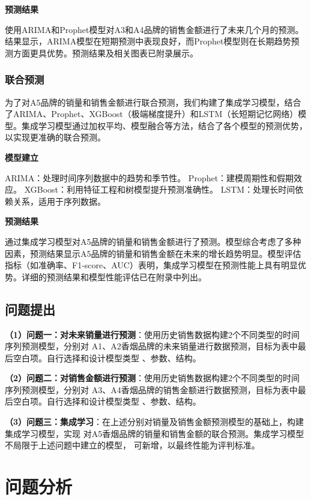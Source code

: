 \documentclass[a4paper]{article}
\begin{document}
	\textbf{预测结果}
	
	使用ARIMA和Prophet模型对A3和A4品牌的销售金额进行了未来几个月的预测。结果显示，ARIMA模型在短期预测中表现良好，而Prophet模型则在长期趋势预测方面更具优势。预测结果及相关图表已附录展示。
	
	\subsubsection{联合预测}
	
	为了对A5品牌的销量和销售金额进行联合预测，我们构建了集成学习模型，结合了ARIMA、Prophet、XGBoost（极端梯度提升）和LSTM（长短期记忆网络）模型。集成学习模型通过加权平均、模型融合等方法，结合了各个模型的预测优势，以实现更准确的联合预测。
	
	\textbf{模型建立}
	
	ARIMA：处理时间序列数据中的趋势和季节性。
	Prophet：建模周期性和假期效应。
	XGBoost：利用特征工程和树模型提升预测准确性。
	LSTM：处理长时间依赖关系，适用于序列数据。
	
	\textbf{预测结果}
	
	通过集成学习模型对A5品牌的销量和销售金额进行了预测。模型综合考虑了多种因素，预测结果显示A5品牌的销量和销售金额在未来的增长趋势明显。模型评估指标（如准确率、F1-score、AUC）表明，集成学习模型在预测性能上具有明显优势。详细的预测结果和模型性能评估已在附录中列出。
	
	\subsection{问题提出}
	\textbf{（1）问题一：对未来销量进行预测}：使用历史销售数据构建2个不同类型的时间序列预测模型，分别对
A1、A2香烟品牌的未来销量进行数据预测，目标为表中最后空白项。自行选择和设计模型类型
、参数、结构。

	\textbf{（2）问题二：对销售金额进行预测}：使用历史销售数据构建2个不同类型的时间序列预测模型，分别对
	A3、A4香烟品牌的销售金额进行数据预测，目标为表中最后空白项。自行选择和设计模型类型
	、参数、结构。

	\textbf{（3）问题三：集成学习}：在上述分别对销量及销售金额预测模型的基础上，构建集成学习模型，实现
	对A5香烟品牌的销量和销售金额的联合预测。集成学习模型不局限于上述问题中建立的模型，
	可新增，以最终性能为评判标准。
	\section{问题分析}
\end{document}
